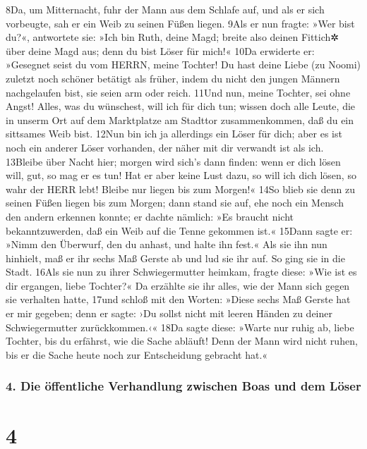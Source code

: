 8Da, um Mitternacht, fuhr der Mann aus dem Schlafe auf, und als er sich
vorbeugte, sah er ein Weib zu seinen Füßen liegen. 9Als er nun fragte:
»Wer bist du?«, antwortete sie: »Ich bin Ruth, deine Magd; breite also
deinen Fittich✲ über deine Magd aus; denn du bist Löser für mich!« 10Da
erwiderte er: »Gesegnet seist du vom HERRN, meine Tochter! Du hast deine
Liebe (zu Noomi) zuletzt noch schöner betätigt als früher, indem du
nicht den jungen Männern nachgelaufen bist, sie seien arm oder reich.
11Und nun, meine Tochter, sei ohne Angst! Alles, was du wünschest, will
ich für dich tun; wissen doch alle Leute, die in unserm Ort auf dem
Marktplatze am Stadttor zusammenkommen, daß du ein sittsames Weib bist.
12Nun bin ich ja allerdings ein Löser für dich; aber es ist noch ein
anderer Löser vorhanden, der näher mit dir verwandt ist als ich.
13Bleibe über Nacht hier; morgen wird sich's dann finden: wenn er dich
lösen will, gut, so mag er es tun! Hat er aber keine Lust dazu, so will
ich dich lösen, so wahr der HERR lebt! Bleibe nur liegen bis zum
Morgen!« 14So blieb sie denn zu seinen Füßen liegen bis zum Morgen; dann
stand sie auf, ehe noch ein Mensch den andern erkennen konnte; er dachte
nämlich: »Es braucht nicht bekanntzuwerden, daß ein Weib auf die Tenne
gekommen ist.« 15Dann sagte er: »Nimm den Überwurf, den du anhast, und
halte ihn fest.« Als sie ihn nun hinhielt, maß er ihr sechs Maß Gerste
ab und lud sie ihr auf. So ging sie in die Stadt. 16Als sie nun zu ihrer
Schwiegermutter heimkam, fragte diese: »Wie ist es dir ergangen, liebe
Tochter?« Da erzählte sie ihr alles, wie der Mann sich gegen sie
verhalten hatte, 17und schloß mit den Worten: »Diese sechs Maß Gerste
hat er mir gegeben; denn er sagte: ›Du sollst nicht mit leeren Händen zu
deiner Schwiegermutter zurückkommen.‹« 18Da sagte diese: »Warte nur
ruhig ab, liebe Tochter, bis du erfährst, wie die Sache abläuft! Denn
der Mann wird nicht ruhen, bis er die Sache heute noch zur Entscheidung
gebracht hat.«

\hypertarget{die-uxf6ffentliche-verhandlung-zwischen-boas-und-dem-luxf6ser}{%
\subsubsection{4. Die öffentliche Verhandlung zwischen Boas und dem
Löser}\label{die-uxf6ffentliche-verhandlung-zwischen-boas-und-dem-luxf6ser}}

\hypertarget{section-3}{%
\section{4}\label{section-3}}

